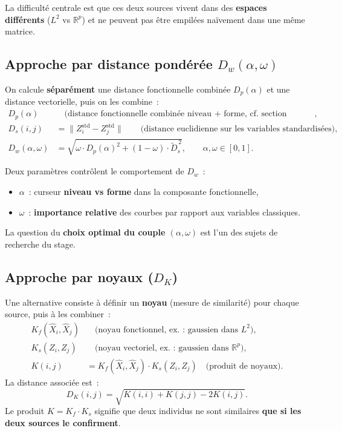 \documentclass[11pt, a4paper]{article}
\newcommand{\R}{\mathbb{R}}
\begin{document}
La difficult\'e centrale est que ces deux sources vivent dans des \textbf{espaces diff\'erents} ($L^2$ vs $\R^p$) et ne peuvent pas \^etre empil\'ees na\"ivement dans une m\^eme matrice.

\subsection{Approche par distance pond\'er\'ee $D_w(\alpha, \omega)$}

On calcule \textbf{s\'epar\'ement} une distance fonctionnelle combin\'ee $D_p(\alpha)$ et une distance vectorielle, puis on les combine~:
\begin{align*}
    D_p(\alpha) &\quad \text{(distance fonctionnelle combin\'ee niveau + forme, cf.\ section pr\'ec\'edente)}, \\
    D_s(i,j) &= \| Z_i^{\text{std}} - Z_j^{\text{std}} \| \qquad \text{(distance euclidienne sur les variables standardis\'ees)}, \\
    D_w(\alpha, \omega) &= \sqrt{\omega \cdot D_p(\alpha)^2 + (1 - \omega) \cdot \tilde{D}_s^{\,2}}, \qquad \alpha, \omega \in [0, 1].
\end{align*}

Deux param\`etres contr\^olent le comportement de $D_w$~:
\begin{itemize}[nosep]
    \item $\alpha$~: curseur \textbf{niveau vs forme} dans la composante fonctionnelle,
    \item $\omega$~: \textbf{importance relative} des courbes par rapport aux variables classiques.
\end{itemize}
La question du \textbf{choix optimal du couple $(\alpha, \omega)$} est l'un des sujets de recherche du stage.

\subsection{Approche par noyaux ($D_K$)}

Une alternative consiste \`a d\'efinir un \textbf{noyau} (mesure de similarit\'e) pour chaque source, puis \`a les combiner~:
\begin{align*}
    K_f(\hat{X}_i, \hat{X}_j) &\quad \text{(noyau fonctionnel, ex.~: gaussien dans $L^2$)}, \\
    K_s(Z_i, Z_j) &\quad \text{(noyau vectoriel, ex.~: gaussien dans $\R^p$)}, \\
    K(i,j) &= K_f(\hat{X}_i, \hat{X}_j) \cdot K_s(Z_i, Z_j) \quad \text{(produit de noyaux)}.
\end{align*}
La distance associ\'ee est~:
\[
    D_K(i,j) = \sqrt{K(i,i) + K(j,j) - 2K(i,j)}.
\]
Le produit $K = K_f \cdot K_s$ signifie que deux individus ne sont similaires \textbf{que si les deux sources le confirment}.
\end{document}
